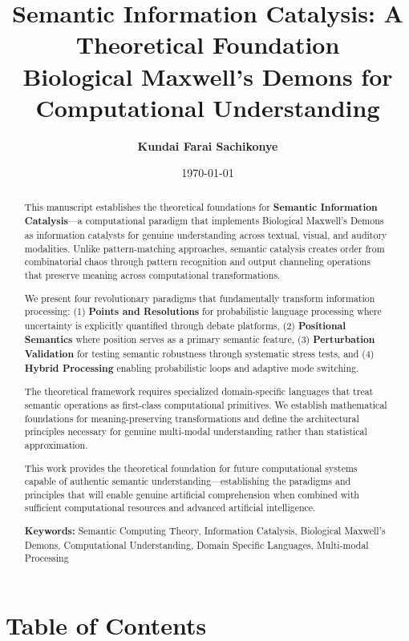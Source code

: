 \documentclass[12pt,a4paper,twoside]{article}
\title{
    \vspace{-2cm}
    {\Huge \textbf{Semantic Information Catalysis: A Theoretical Foundation}} \\
    \vspace{0.5cm}
    {\Large Biological Maxwell's Demons for Computational Understanding} \\

}
\author{
    \textbf{Kundai Farai Sachikonye}

}
\date{\today}
\begin{document}
\maketitle

\begin{abstract}

This manuscript establishes the theoretical foundations for \textbf{Semantic Information Catalysis}—a computational paradigm that implements Biological Maxwell's Demons as information catalysts for genuine understanding across textual, visual, and auditory modalities. Unlike pattern-matching approaches, semantic catalysis creates order from combinatorial chaos through pattern recognition and output channeling operations that preserve meaning across computational transformations.

We present four revolutionary paradigms that fundamentally transform information processing: (1) \textbf{Points and Resolutions} for probabilistic language processing where uncertainty is explicitly quantified through debate platforms, (2) \textbf{Positional Semantics} where position serves as a primary semantic feature, (3) \textbf{Perturbation Validation} for testing semantic robustness through systematic stress tests, and (4) \textbf{Hybrid Processing} enabling probabilistic loops and adaptive mode switching.

The theoretical framework requires specialized domain-specific languages that treat semantic operations as first-class computational primitives. We establish mathematical foundations for meaning-preserving transformations and define the architectural principles necessary for genuine multi-modal understanding rather than statistical approximation.

This work provides the theoretical foundation for future computational systems capable of authentic semantic understanding—establishing the paradigms and principles that will enable genuine artificial comprehension when combined with sufficient computational resources and advanced artificial intelligence.

\textbf{Keywords:} Semantic Computing Theory, Information Catalysis, Biological Maxwell's Demons, Computational Understanding, Domain Specific Languages, Multi-modal Processing

\end{abstract}

\newpage

\section*{Table of Contents}
\end{document}
